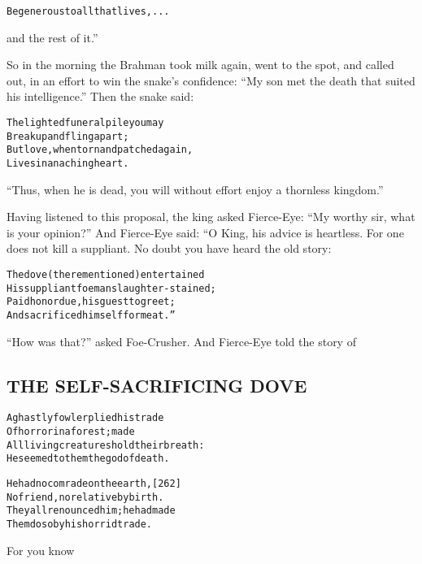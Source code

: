 \documentclass{article}
\renewenvironment{verbatim}{\begin{alltt}\normalfont\begin{centering}}{\end{centering}\end{alltt}}
\begin{document}
\begin{verbatim}
Be generous to all that lives, . . .
\end{verbatim}
and the rest of it.”

So in the morning the Brahman took milk again, went to the spot,
and called out, in an effort to win the snake's confidence:
``My son met the death that suited his intelligence.'' Then the
snake said:

\begin{verbatim}
The lighted funeral pile you may
    Break up and fling apart;
But love, when torn and patched again,
    Lives in an aching heart.                           
\end{verbatim}
``Thus, when he is dead, you will without effort enjoy a thornless kingdom.''

Having listened to this proposal, the king asked Fierce-Eye:
``My worthy sir, what is your opinion?'' And Fierce-Eye said: “O
King, his advice is heartless. For one does not kill a suppliant.
No doubt you have heard the old story:

\begin{verbatim}
The dove (there mentioned) entertained
His suppliant foeman slaughter-stained;
Paid honor due, his guest to greet;
And sacrificed himself for meat.”
\end{verbatim}
``How was that?'' asked Foe-Crusher. And Fierce-Eye told the story
of

\subsection{THE SELF-SACRIFICING DOVE}

\begin{verbatim}
A ghastly fowler plied his trade
Of horror in a forest; made
All living creatures hold their breath:
He seemed to them the god of death.

He had no comrade on the earth,                         [262]
No friend, no relative by birth.
They all renounced him; he had made
Them do so by his horrid trade.
\end{verbatim}
For you know
\end{document}
